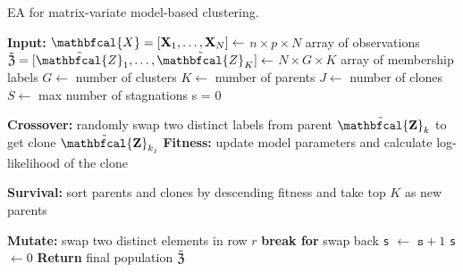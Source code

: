 \documentclass[12pt]{report}
\begin{document}
\begin{algorithm}[H]
\caption{EA for matrix-variate model-based clustering.}
\begin{algorithmic}[1]
	\Statex \textbf{Input:}
     		\Statex $ {\mathbfcal{X}} = [{\bf X}_1, \dots, {\bf X}_N ]\gets$ $n \times p \times N$ array of observations
		\Statex $ \tilde{ {\bf \mathfrak{Z} }} = [\tilde{ {\mathbfcal{Z}}}_{1}, \dots, \tilde{ {\mathbfcal{Z}}}_{K}]  \gets$ $N \times G \times K$ array of membership labels 
		 \Statex $G \gets$ number of clusters
   		 \Statex $K \gets$ number of parents
    		 \Statex $J \gets$ number of clones
    		 \Statex $S \gets$ max number of stagnations
\State s = 0

	 
		        \State \textbf{Crossover:} randomly swap two distinct labels from parent $\tilde{ {\bf \mathbfcal{Z}}}_{k}$ to get clone $\tilde{{\bf  \mathbfcal{Z}}}_{k_j}$
       			 \State \textbf{Fitness:} update model parameters and calculate log-likelihood of the clone 
		\EndFor
	\EndFor
	
	\State \textbf{Survival:} sort parents and clones by descending fitness and take top $K$ as new parents 
		
	 
        			\State \textbf{Mutate:} swap two distinct elements in row $r$ 
        				\State \textbf{break for}
     			\Else
     				\State swap back 
   			 \EndIf
        		\EndFor
        \EndFor  
        \State \texttt{s} $\gets$  $\texttt{s}  + 1$
        \Else
        \State \texttt{s} $\gets 0$ 
    \EndIf
\EndWhile
\Statex \textbf{Return} final population $\tilde{ {\bf \mathfrak{Z} }}$
\end{algorithmic}
\end{algorithm}





\end{document}
